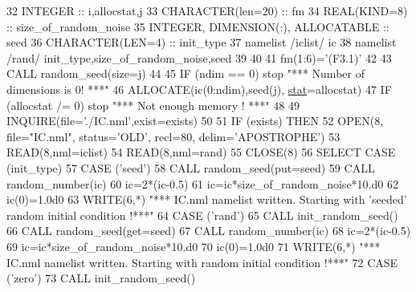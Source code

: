 \begin{DoxyCode}
32     \textcolor{keywordtype}{INTEGER} :: i,allocstat,j
33     \textcolor{keywordtype}{CHARACTER(len=20)} :: fm
34     \textcolor{keywordtype}{REAL(KIND=8)} :: size\_of\_random\_noise
35     \textcolor{keywordtype}{INTEGER}, \textcolor{keywordtype}{DIMENSION(:)}, \textcolor{keywordtype}{ALLOCATABLE} :: seed
36     \textcolor{keywordtype}{CHARACTER(LEN=4)} :: init\_type 
37     namelist /iclist/ ic
38     namelist /rand/ init\_type,size\_of\_random\_noise,seed
39 
40 
41     fm(1:6)=\textcolor{stringliteral}{'(F3.1)'}
42 
43     \textcolor{keyword}{CALL }random\_seed(size=j)
44    
45     \textcolor{keywordflow}{IF} (ndim == 0) stop \textcolor{stringliteral}{"*** Number of dimensions is 0! ***"}
46     \textcolor{keyword}{ALLOCATE}(ic(0:ndim),seed(j), \hyperlink{namespacestat}{stat}=allocstat)
47     \textcolor{keywordflow}{IF} (allocstat /= 0) stop \textcolor{stringliteral}{"*** Not enough memory ! ***"}
48 
49     \textcolor{keyword}{INQUIRE}(file=\textcolor{stringliteral}{'./IC.nml'},exist=exists)
50 
51     \textcolor{keywordflow}{IF} (exists) \textcolor{keywordflow}{THEN}
52        \textcolor{keyword}{OPEN}(8, file=\textcolor{stringliteral}{"IC.nml"}, status=\textcolor{stringliteral}{'OLD'}, recl=80, delim=\textcolor{stringliteral}{'APOSTROPHE'})
53        \textcolor{keyword}{READ}(8,nml=iclist)
54        \textcolor{keyword}{READ}(8,nml=rand)
55        \textcolor{keyword}{CLOSE}(8)
56        \textcolor{keywordflow}{SELECT CASE} (init\_type)
57          \textcolor{keywordflow}{CASE} (\textcolor{stringliteral}{'seed'})
58            \textcolor{keyword}{CALL }random\_seed(put=seed)
59            \textcolor{keyword}{CALL }random\_number(ic)
60            ic=2*(ic-0.5)
61            ic=ic*size\_of\_random\_noise*10.d0
62            ic(0)=1.0d0
63            \textcolor{keyword}{WRITE}(6,*) \textcolor{stringliteral}{"*** IC.nml namelist written. Starting with 'seeded' random initial condition !***"}
64          \textcolor{keywordflow}{CASE} (\textcolor{stringliteral}{'rand'})
65            \textcolor{keyword}{CALL }init\_random\_seed()
66            \textcolor{keyword}{CALL }random\_seed(get=seed)
67            \textcolor{keyword}{CALL }random\_number(ic)
68            ic=2*(ic-0.5)
69            ic=ic*size\_of\_random\_noise*10.d0
70            ic(0)=1.0d0
71            \textcolor{keyword}{WRITE}(6,*) \textcolor{stringliteral}{"*** IC.nml namelist written. Starting with random initial condition !***"}
72          \textcolor{keywordflow}{CASE} (\textcolor{stringliteral}{'zero'})
73            \textcolor{keyword}{CALL }init\_random\_seed()

\end{DoxyCode}
